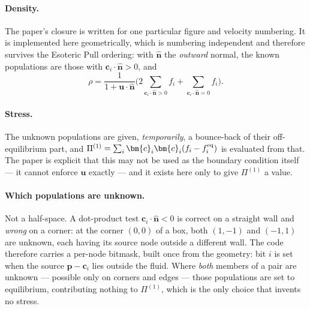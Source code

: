 \documentclass[11pt,a4paper]{article}
\newcommand{\ci}{\bm{c}_i}
\newcommand{\uu}{\bm{u}}
\begin{document}
\paragraph{Density.} The paper's closure is written for one particular figure and
velocity numbering. It is implemented here geometrically, which is numbering
independent and therefore survives the Esoteric Pull ordering: with $\hat{\bm n}$
the \emph{outward} normal, the known populations are those with
$\ci\!\cdot\!\hat{\bm n}>0$, and
\begin{equation}
  \rho = \frac{1}{1+\uu\cdot\hat{\bm n}}
         \Big(2\!\!\sum_{\ci\cdot\hat{\bm n}>0}\!\! f_i
              + \!\!\sum_{\ci\cdot\hat{\bm n}=0}\!\! f_i\Big).
  \label{eq:bc3rho}
\end{equation}

\paragraph{Stress.} The unknown populations are given, \emph{temporarily}, a
bounce-back of their off-equilibrium part, and $\Pi^{(1)}=\sum_i\ci\ci(f_i-f_i^{\rm eq})$
is evaluated from that. The paper is explicit that this may not be used as the
boundary condition itself --- it cannot enforce $\uu$ exactly --- and it exists
here only to give $\Pi^{(1)}$ a value.

\paragraph{Which populations are unknown.} Not a half-space. A dot-product test
$\ci\!\cdot\!\hat{\bm n}<0$ is correct on a straight wall and \emph{wrong} on a
corner: at the corner $(0,0)$ of a box, both $(1,-1)$ and $(-1,1)$ are unknown,
each having its source node outside a different wall. The code therefore carries
a per-node bitmask, built once from the geometry: bit $i$ is set when the source
$\bm{p}-\ci$ lies outside the fluid. Where \emph{both} members of a pair are
unknown --- possible only on corners and edges --- those populations are set to
equilibrium, contributing nothing to $\Pi^{(1)}$, which is the only choice that
invents no stress.
\end{document}
